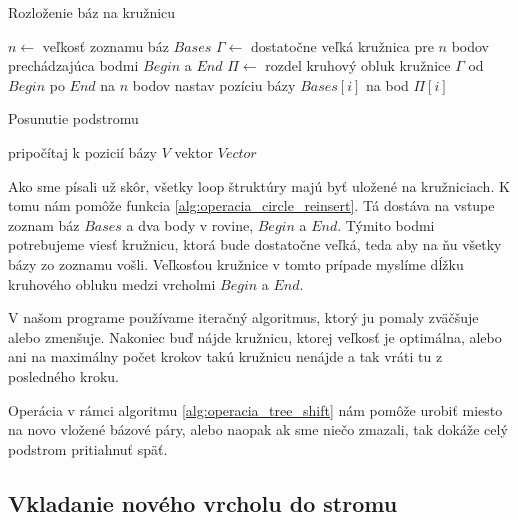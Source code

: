 \begin{algorithm}
  \caption{Rozloženie báz na kružnicu}
  \label{alg:operácia_circle_reinsert}
  \begin{algorithmic}[1]
      \State $n \gets$ veľkosť zoznamu báz $Bases$
      \State $\Gamma \gets$ dostatočne veľká kružnica pre $n$ bodov prechádzajúca bodmi $Begin$ a $End$
      \State $\Pi \gets$ rozdel kruhový obluk kružnice $\Gamma$ od $Begin$ po $End$ na $n$ bodov
        \State nastav pozíciu bázy $Bases[i]$ na bod $\Pi[i]$
      \EndFor
    \EndProcedure
  \end{algorithmic}
\end{algorithm}

\begin{algorithm}
  \caption{Posunutie podstromu}
  \label{alg:operacia_tree_shift}
  \begin{algorithmic}[1]
          \State pripočítaj k pozicií bázy $V$ vektor $Vector$
        \EndIf
      \EndFor
    \EndProcedure
  \end{algorithmic}
\end{algorithm}

Ako sme písali už skôr, všetky loop štruktúry majú byť uložené na kružniciach. K tomu nám pomôže funkcia
\ref{alg:operacia_circle_reinsert}. Tá dostáva na vstupe zoznam báz $Bases$ a dva body v rovine, $Begin$ a $End$.
Týmito bodmi potrebujeme viesť kružnicu, ktorá bude dostatočne veľká, teda aby na ňu všetky bázy zo zoznamu vošli.
Veľkosťou kružnice v tomto prípade myslíme dĺžku kruhového obluku medzi vrcholmi $Begin$ a $End$.

V našom programe používame iteračný algoritmus, ktorý ju pomaly zväčšuje alebo zmenšuje.
Nakoniec buď nájde kružnicu, ktorej veľkosť je optimálna, alebo ani na maximálny počet krokov takú kružnicu nenájde
a tak vráti tu z posledného kroku.

Operácia v rámci algoritmu \ref{alg:operacia_tree_shift} nám pomôže urobiť miesto na novo vložené bázové páry,
alebo naopak ak sme niečo zmazali, tak dokáže celý podstrom pritiahnuť späť.

\subsection{Vkladanie nového vrcholu do stromu}


